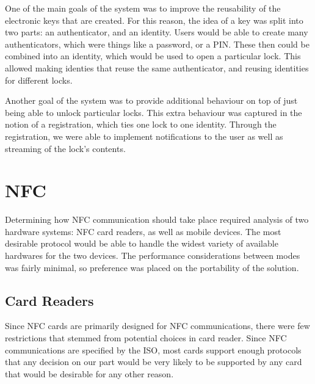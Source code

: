 \documentclass[12pt]{report}
\begin{document}
One of the main goals of the system was to improve the reusability of the electronic keys that are created. For this
reason, the idea of a key was split into two parts: an authenticator, and an identity. Users would be able to create
many authenticators, which were things like a password, or a PIN. These then could be combined into an identity, which
would be used to open a particular lock. This allowed making identies that reuse the same authenticator, and reusing
identities for different locks.

Another goal of the system was to provide additional behaviour on top of just being able to unlock particular locks.
This extra behaviour was captured in the notion of a registration, which ties one lock to one identity. Through the
registration, we were able to implement notifications to the user as well as streaming of the lock's contents.



\section{NFC}

Determining how NFC communication should take place required analysis of two hardware systems: NFC card readers, as well
as mobile devices. The most desirable protocol would be able to handle the widest variety of available hardwares for
the two devices. The performance considerations between modes was fairly minimal, so preference was placed on the
portability of the solution.


\subsection{Card Readers}

Since NFC cards are primarily designed for NFC communications, there were few restrictions that stemmed from potential
choices in card reader. Since NFC communications are specified by the ISO, most cards support enough protocols that any
decision on our part would be very likely to be supported by any card that would be desirable for any other reason.

\end{document}
